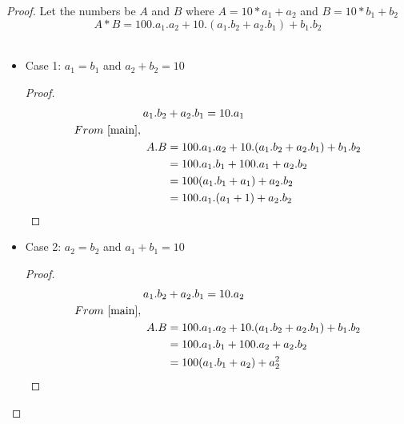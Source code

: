 \documentclass{article}
\begin{document}
    \begin{proof}
         Let the numbers be $A$ and $B$  where 
         $A = 10*a_{1} + a_{2}$ and 
         $B = 10*b_{1} + b_{2}$     
         \\
         \begin{equation}   \label{main}
             A*B = 100.a_{1}.a_{2}+10.(a_{1}.b_{2}+a_{2}.b_{1}) + b_{1}.b_{2}
         \end{equation} \\
         
        \begin{itemize}
                 \item  Case 1: $a_{1} = b_{1}$ and $a_{2}+ b_{2}=10$\\ 
                        \begin{proof}
                                                    \begin{align*}
                                a_{1}.b_{2} &+ a_{2}.b_{1} = 10.a_{1} \\
                                From\  \ref{main},\ \ \ \ \ \ \  &\\
                                A.B &=100.a_{1}.a_{2}+10.(a_{1}.b_{2}+a_{2}.b_{1}) + b_{1}.b_{2}  \\
                                &=100.{a_{1}.b_{1}} + 100.a_{1} + a_{2}.b_{2}\\
                                &=100(a_{1}.b_{1} + a_{1}) + a_{2}.b_{2} \\
                                &=100.a_{1}.(a_{1} + 1) + a_{2}.b_{2}
                        \end{align*}
                        \end{proof}
                 \item  Case 2: $a_{2} = b_{2}$ and $a_{1}+ b_{1}=10$\\
                    \begin{proof}    
                                                \begin{align*}
                                a_{1}.b_{2} &+ a_{2}.b_{1} = 10.a_{2} \\
                                From\  \ref{main},\ \ \ \ \ \ \  &\\
                                A.B &=100.a_{1}.a_{2}+10.(a_{1}.b_{2}+a_{2}.b_{1}) + b_{1}.b_{2}  \\
                                &=100.{a_{1}.b_{1}} + 100.a_{2} + a_{2}.b_{2}\\
                                &=100(a_{1}.b_{1} + a_{2}) + a_{2}^2
                        \end{align*}
                    \end{proof}    
        \end{itemize}
    \end{proof}
\end{document}
